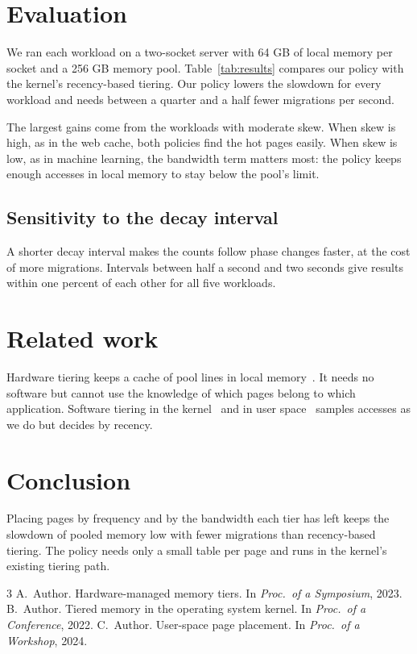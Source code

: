 \documentclass[sigconf,nonacm]{acmart}
\begin{document}
\section{Evaluation}
We ran each workload on a two-socket server with 64 GB of local memory per socket and a 256 GB
memory pool. Table~\ref{tab:results} compares our policy with the kernel's recency-based
tiering. Our policy lowers the slowdown for every workload and needs between a quarter and a
half fewer migrations per second.

The largest gains come from the workloads with moderate skew. When skew is high, as in the web
cache, both policies find the hot pages easily. When skew is low, as in machine learning, the
bandwidth term matters most: the policy keeps enough accesses in local memory to stay below the
pool's limit.

\subsection{Sensitivity to the decay interval}
A shorter decay interval makes the counts follow phase changes faster, at the cost of more
migrations. Intervals between half a second and two seconds give results within one percent of
each other for all five workloads.

\section{Related work}
Hardware tiering keeps a cache of pool lines in local memory~\cite{hw}. It needs no software but
cannot use the knowledge of which pages belong to which application. Software tiering in the
kernel~\cite{kernel} and in user space~\cite{user} samples accesses as we do but decides by
recency.

\section{Conclusion}
Placing pages by frequency and by the bandwidth each tier has left keeps the slowdown of pooled
memory low with fewer migrations than recency-based tiering. The policy needs only a small
table per page and runs in the kernel's existing tiering path.

\balance
\begin{thebibliography}{3}
 A.~Author. Hardware-managed memory tiers. In \emph{Proc.\ of a Symposium}, 2023.
 B.~Author. Tiered memory in the operating system kernel. In \emph{Proc.\ of a
Conference}, 2022.
 C.~Author. User-space page placement. In \emph{Proc.\ of a Workshop}, 2024.
\end{thebibliography}
\end{document}
